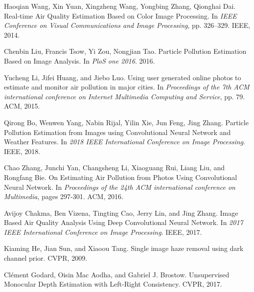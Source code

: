 \documentclass{article}
\begin{document}
\begin{thebibliography}{1}

Haoqian Wang, Xin Yuan, Xingzheng Wang, Yongbing Zhang, Qionghai Dai.
\newblock Real-time Air Quality Estimation Based on Color
Image Processing.
\newblock In {\em IEEE Conference on Visual Communications and Image Processing}, pp. 326–329. IEEE, 2014.

Chenbin Liu, Francis Tsow, Yi Zou, Nongjian Tao.
\newblock Particle Pollution Estimation Based on Image
Analysis.
\newblock In {\em PloS one 2016}. 2016.

Yucheng Li, Jifei Huang, and Jiebo Luo. 
\newblock Using user generated online photos to estimate and monitor air pollution in major cities.
\newblock In {\em Proceedings of the 7th ACM international conference on Internet Multimedia Computing and Service}, pp. 79. ACM, 2015.

Qirong Bo, Wenwen Yang, Nabin Rijal, Yilin Xie, Jun Feng, Jing Zhang.
\newblock Particle Pollution Estimation from Images using Convolutional Neural Network and Weather Features.
\newblock In {\em 2018 IEEE International Conference on Image Processing}. IEEE, 2018.

Chao Zhang, Junchi Yan, Changsheng Li, Xiaoguang Rui, Liang Liu, and Rongfang Bie.
\newblock On Estimating Air Pollution from Photos Using
Convolutional Neural Network.
\newblock In {\em Proceedings of the 24th ACM international conference on Multimedia}, pages 297-301. ACM, 2016.

Avijoy Chakma, Ben Vizena, Tingting Cao, Jerry Lin, and Jing Zhang.
\newblock Image Based Air Quality Analysis Using Deep
Convolutional Neural Network.
\newblock In {\em 2017 IEEE International Conference on Image Processing}. IEEE, 2017.

Kiaming He, Jian Sun, and Xiaoou Tang. 
\newblock Single image haze removal using dark channel prior. CVPR, 2009.

Clément Godard, Oisin Mac Aodha, and Gabriel J. Brostow.
\newblock Unsupervised Monocular Depth Estimation with Left-Right Consistency. CVPR, 2017.


\end{thebibliography}
\end{document}
